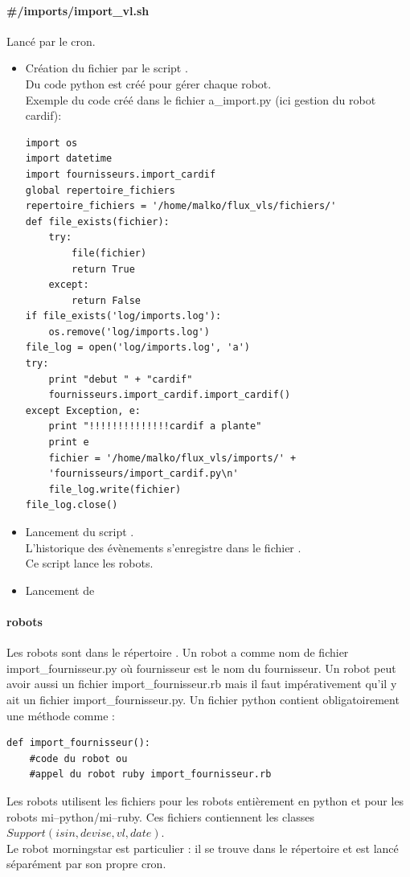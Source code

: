 \paragraph{{\#}/imports/import{\_}vl.sh} Lancé par le cron.
\begin{itemize}
\item Création du fichier  par le script .\\
Du code python est créé pour gérer chaque robot.\\
Exemple du code créé dans le fichier a{\_}import.py (ici gestion du robot cardif): \\
\begin{lstlisting}
import os
import datetime
import fournisseurs.import_cardif
global repertoire_fichiers
repertoire_fichiers = '/home/malko/flux_vls/fichiers/'
def file_exists(fichier):
    try:
        file(fichier)
        return True
    except:
        return False
if file_exists('log/imports.log'):
    os.remove('log/imports.log')
file_log = open('log/imports.log', 'a')
try:
    print "debut " + "cardif"
    fournisseurs.import_cardif.import_cardif()
except Exception, e:
    print "!!!!!!!!!!!!!!cardif a plante"
    print e
    fichier = '/home/malko/flux_vls/imports/' +
	'fournisseurs/import_cardif.py\n'
    file_log.write(fichier)
file_log.close()
\end{lstlisting}
\item Lancement du script .\\
	L'historique des évènements s'enregistre dans le fichier .\\
	Ce script lance les robots.
\item Lancement de 
\end{itemize}
\paragraph{robots}
\label{robots}
Les robots sont dans le répertoire . Un robot a comme nom de fichier import{\_}fournisseur.py où fournisseur est le nom du fournisseur. Un robot peut avoir aussi un fichier import{\_}fournisseur.rb mais il faut impérativement qu'il y ait un fichier import{\_}fournisseur.py. Un fichier python contient obligatoirement une méthode comme : 
\begin{lstlisting}
def import_fournisseur():
	#code du robot ou 
	#appel du robot ruby import_fournisseur.rb
\end{lstlisting}
Les robots utilisent les fichiers  pour les robots entièrement en python et  pour les robots mi--python/mi--ruby. Ces fichiers contiennent les classes $Support(isin, devise, vl, date)$.\\
Le robot morningstar est particulier : il se trouve dans le répertoire  et est lancé séparément par son propre cron.
